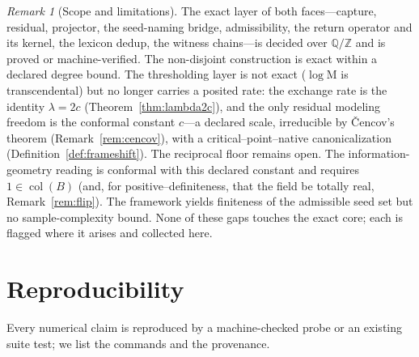 \documentclass[11pt]{article}
\theoremstyle{plain}
\theoremstyle{definition}
\theoremstyle{remark}
\newtheorem{remark}[theorem]{Remark}
\newcommand{\Q}{\mathbb{Q}}
\newcommand{\Z}{\mathbb{Z}}
\newcommand{\Mah}{\mathrm{M}}
\newcommand{\BB}{B}
\DeclareMathOperator{\col}{col}
\begin{document}
\begin{remark}[Scope and limitations]\label{rem:limits}
The exact layer of both faces---capture, residual, projector, the seed-naming bridge, admissibility, the
return operator and its kernel, the lexicon dedup, the witness chains---is decided over $\Q/\Z$ and is proved
or machine-verified. The non-disjoint construction is exact within a declared degree bound. The thresholding
layer is not exact ($\log\Mah$ is transcendental) but no longer carries a posited rate: the exchange rate is the
identity $\lambda=2c$ (Theorem~\ref{thm:lambda2c}), and the only residual modeling freedom is the conformal
constant $c$---a declared scale, irreducible by \v{C}encov's theorem (Remark~\ref{rem:cencov}), with a
critical--point--native canonicalization (Definition~\ref{def:frameshift}). The reciprocal floor remains open.
The information-geometry reading is conformal with this declared constant and requires $1\in\col(\BB)$ (and, for
positive--definiteness, that the field be totally real, Remark~\ref{rem:flip}). The framework yields finiteness
of the admissible seed set but no sample-complexity bound.
None of these gaps touches the exact core; each is flagged where it arises and collected here.
\end{remark}

\appendix
\section{Reproducibility}\label{sec:appendix}

Every numerical claim is reproduced by a machine-checked probe or an existing suite test; we list the commands
and the provenance.
\end{document}
